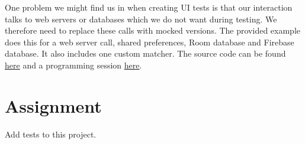 One problem we might find us in when creating UI tests is that our interaction talks to web servers or databases which we do not want during testing. We therefore need to replace these calls with mocked versions. The provided example does this for a web server call, shared preferences, Room database and Firebase database. It also includes one custom matcher. The source code can be found \href{https://github.com/JonSteinn/AndroidDevelopment/tree/master/examples/lab6/espressotest}{here} and a programming session \href{TODO}{here}.


\section{Assignment}
Add tests to this project.
